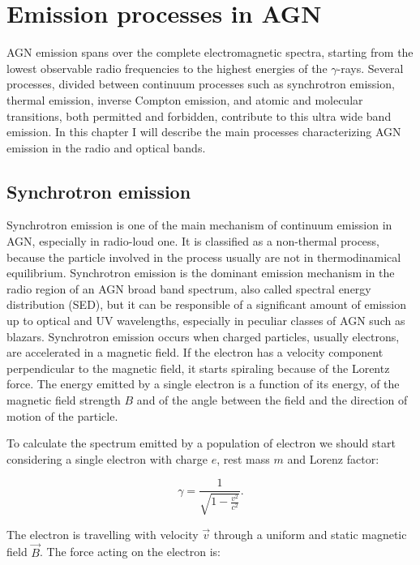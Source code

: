 \documentclass[../thesis.tex]{subfiles}
\begin{document}
\chapter{Emission processes in AGN}
\label{cap:emission}

AGN emission spans over the complete electromagnetic spectra, starting from the lowest observable radio frequencies to the highest energies of the $\gamma$-rays.
Several processes, divided between continuum processes such as synchrotron emission, thermal emission, inverse Compton emission, and atomic and molecular transitions, both permitted and forbidden, contribute to this ultra wide band emission.
In this chapter I will describe the main processes characterizing AGN emission in the radio and optical bands.

\section{Synchrotron emission}
\label{sec:synchrotron}

Synchrotron emission is one of the main mechanism of continuum emission in AGN, especially in radio-loud one.
It is classified as a non-thermal process, because the particle involved in the process usually are not in thermodinamical equilibrium.
Synchrotron emission is the dominant emission mechanism in the radio region of an AGN broad band spectrum, also called spectral energy distribution (SED), but it can be responsible of a significant amount of emission up to optical and UV wavelengths, especially in peculiar classes of AGN such as blazars.
Synchrotron emission occurs when charged particles, usually electrons, are accelerated in a magnetic field.
If the electron has a velocity component perpendicular to the magnetic field, it starts spiraling because of the Lorentz force.
The energy emitted by a single electron is a function of its energy, of the magnetic field strength $B$ and of the angle between the field and the direction of motion of the particle.

To calculate the spectrum emitted by a population of electron we should start considering a single electron with charge $e$, rest mass $m$ and Lorenz factor:

\begin{equation}
    \label{eq:lorentz}
    \gamma = \frac{1}{\sqrt{1-\frac{v^2}{c^2}}}.
\end{equation}

The electron is travelling with velocity $\vec{v}$ through a uniform and static magnetic field $\vec{B}$.
The force acting on the electron is:
\end{document}
